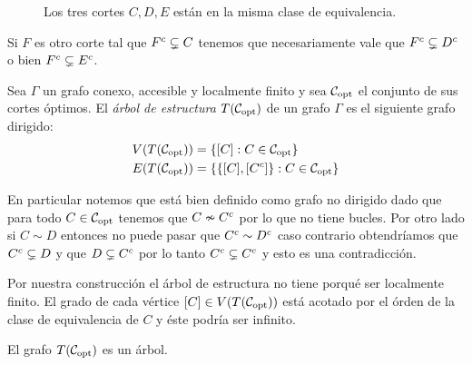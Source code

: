 \documentclass[tesis.tex]{subfiles}
\begin{document}
\begin{ej}
\begin{figure}[H]
		\caption{\small{Los tres cortes $C,D,E$ están en la misma clase de equivalencia.}}
	\end{figure}

	Si $F$ es otro corte tal que $F^{c} \subsetneq C$ tenemos que necesariamente vale que $F^{c} \subsetneq D^{c}$ o bien $F^{c} \subsetneq E^{c}$.
\end{ej}

\begin{deff}
	Sea $\Gamma$ un grafo conexo, accesible y localmente finito y sea ${\cal C}_{\text{opt}}$ el conjunto de sus cortes óptimos.
	El \emph{árbol de estructura} $T({\cal C}_{\text{opt}})$ de un grafo $\Gamma$ es el siguiente grafo dirigido:
	\begin{align*}
		V(T({\cal C}_{\text{opt}})) &= \{ [C] : C \in {\cal C}_{\text{opt}} \} \\
		E(T({\cal C}_{\text{opt}})) &= \{ \{ [C], [C^{c}] \} : C \in {\cal C}_{\text{opt}}   \}
	\end{align*}
\end{deff}

En particular notemos que está bien definido como grafo no dirigido dado que para todo $C \in {\cal C}_{\text{opt}}$ tenemos que $C \nsim C^{c}$ por lo que no tiene bucles.
Por otro lado si $C \sim D$ entonces no puede pasar que $C^{c} \sim D^{c}$ caso contrario obtendríamos que $C^{c} \subsetneq D$ y que $D \subsetneq C^{c}$ por lo tanto $C^{c} \subsetneq C^{c}$ y esto es una contradicción.

\begin{obs}
	Por nuestra construcción el árbol de estructura no tiene porqué ser localmente finito.
	El grado de cada vértice $[C] \in V(T({\cal C}_{\text{opt}}))$ está acotado por el órden de la clase de equivalencia de $C$ y éste podría ser infinito.
\end{obs}


\begin{prop}
	El grafo $T({\cal C}_{\text{opt}})$ es un árbol.
\end{prop}
\end{document}
